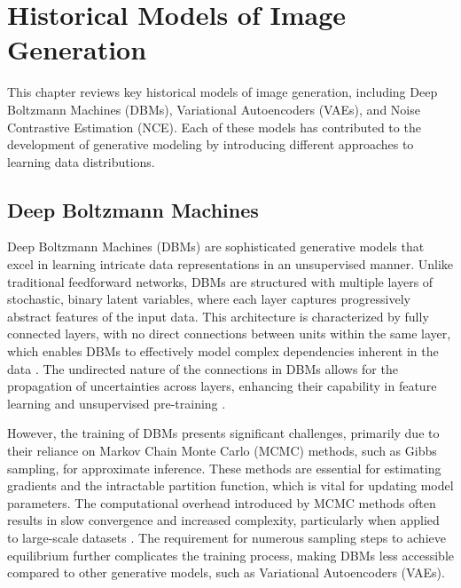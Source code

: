 \chapter{Historical Models of Image Generation}
\label{Related Work}


This chapter reviews key historical models of image generation, including Deep Boltzmann Machines (DBMs), 
Variational Autoencoders (VAEs), and Noise Contrastive Estimation (NCE). Each of these models has contributed 
to the development of generative modeling by introducing different approaches to learning data distributions. 

\section{Deep Boltzmann Machines}

Deep Boltzmann Machines (DBMs) are sophisticated generative models that excel in learning intricate data representations 
in an unsupervised manner. Unlike traditional feedforward networks, DBMs are structured with multiple layers of stochastic, 
binary latent variables, where each layer captures progressively abstract features of the input data. This architecture is 
characterized by fully connected layers, with no direct connections between units within the same layer, which enables DBMs 
to effectively model complex dependencies inherent in the data \citep{10.1007/978-3-642-40728-4_14}. The undirected nature 
of the connections in DBMs allows for the propagation of uncertainties across layers, enhancing their capability in feature 
learning and unsupervised pre-training \citep{10.1007/978-3-642-40728-4_14}\citep{10.48550/arxiv.1203.3783}.

However, the training of DBMs presents significant challenges, primarily due to their reliance on Markov Chain Monte Carlo (MCMC) methods, 
such as Gibbs sampling, for approximate inference. These methods are essential for estimating gradients and the intractable partition 
function, which is vital for updating model parameters. The computational overhead introduced by MCMC methods often results in 
slow convergence and increased complexity, particularly when applied to large-scale datasets \citep{10.48550/arxiv.2303.10728}. 
The requirement for numerous sampling steps to achieve equilibrium further complicates the training process, making DBMs less 
accessible compared to other generative models, such as Variational Autoencoders (VAEs).

